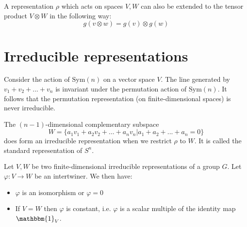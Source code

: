         \begin{example}
            A representation $\rho$ which acts on spaces $V, W$ can also be extended to the tensor product  $V\otimes W$ in the following way:
            \begin{equation}
                g(v\otimes w) = g(v)\otimes g(w)
            \end{equation}
        \end{example}


\section{Irreducible representations}


    \begin{example}
        Consider the action of $\text{Sym}(n)$ on a vector space $V$. The line generated by $v_1+v_2+...+v_n$ is invariant under the permutation action of $\text{Sym}(n)$. It follows that the permutation representation (on finite-dimensional spaces) is never irreducible.

        The $(n-1)$-dimensional complementary subspace
        \begin{equation}
            W = \{a_1v_1 + a_2v_2 + ... + a_nv_n|a_1 + a_2 + ... + a_n = 0\}
        \end{equation}
        does form an irreducible representation when we restrict $\rho$ to $W$. It is called the standard representation of $S^n$.
    \end{example}

        \begin{theorem}\label{rep:schurs_lemma}
            Let $V, W$ be two finite-dimensional irreducible representations of a group $G$. Let $\varphi: V\rightarrow W$ be an intertwiner. We then have:
                \begin{itemize}
                \item $\varphi$ is an isomorphism or $\varphi = 0$
                    \item If $V = W$ then $\varphi$ is constant, i.e. $\varphi$ is a scalar multiple of the identity map $\mathbbm{1}_V$.
            \end{itemize}
        \end{theorem}

